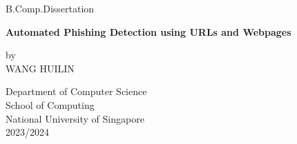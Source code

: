 \begin{titlepage}
    \begin{center}

        \large
            B.Comp.Dissertation \\
            
        \vspace{7cm}
        
        
        \Large
        \textbf{Automated Phishing Detection using URLs and Webpages}
        
        \vspace{2cm}
        
        
        \large
        by\\
        \vspace{0.5cm}
        \large
        WANG HUILIN
            
        \vspace{1.5cm}
            
        \large
        Department of Computer Science \\
        School of Computing \\
        National University of Singapore \\
        
        \vspace{1cm}
        \normalsize
        2023/2024
    \end{center}
\end{titlepage}